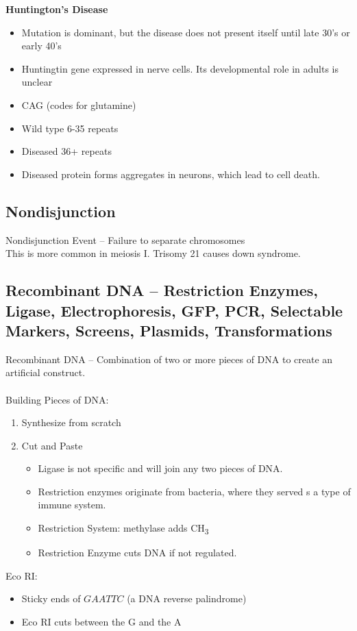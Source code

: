 \documentclass{article}
\begin{document}
\textbf{Huntington's Disease}
\begin{itemize}
\item Mutation is dominant, but the disease does not present itself until late 30's or early 40's
\item Huntingtin gene expressed in nerve cells. Its developmental role in adults is unclear
\item CAG (codes for glutamine)
\item Wild type 6-35 repeats
\item Diseased 36+ repeats
\item Diseased protein forms aggregates in neurons, which lead to cell death.
\end{itemize}

\subsection{Nondisjunction}

Nondisjunction Event -- Failure to separate chromosomes\\
This is more common in meiosis I. Trisomy 21 causes down syndrome.

\subsection{Recombinant DNA -- Restriction Enzymes, Ligase, Electrophoresis, GFP, PCR, Selectable Markers, Screens, Plasmids, Transformations}
Recombinant DNA -- Combination of two or more pieces of DNA to create an artificial construct.\\
\\
Building Pieces of DNA:
\begin{enumerate}
\item Synthesize from scratch
\item Cut and Paste
\begin{itemize}
\item Ligase is not specific and will join any two pieces of DNA.
\item Restriction enzymes originate from bacteria, where they served s a type of immune system.
\item Restriction System: methylase adds CH\textsubscript{3}
\item Restriction Enzyme cuts DNA if not regulated.
\end{itemize}
\end{enumerate}

Eco RI:
\begin{itemize}
\item Sticky ends of $GAATTC$ (a DNA reverse palindrome)
\item Eco RI cuts between the G and the A
\end{itemize}
\end{document}
